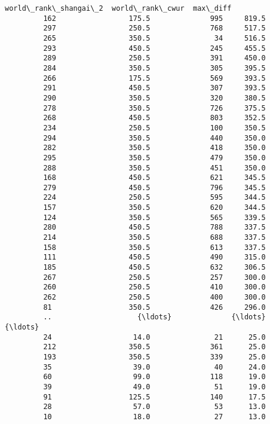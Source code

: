 \documentclass[11pt]{article}
\begin{document}
\begin{Verbatim}[commandchars=\\\{\}]
              world\_rank\_shangai\_2  world\_rank\_cwur  max\_diff  
         162                 175.5              995     819.5  
         297                 250.5              768     517.5  
         265                 350.5               34     516.5  
         293                 450.5              245     455.5  
         289                 250.5              391     450.0  
         284                 350.5              305     395.5  
         266                 175.5              569     393.5  
         291                 450.5              307     393.5  
         290                 350.5              320     380.5  
         278                 350.5              726     375.5  
         268                 450.5              803     352.5  
         234                 250.5              100     350.5  
         294                 350.5              440     350.0  
         282                 350.5              418     350.0  
         295                 350.5              479     350.0  
         288                 350.5              451     350.0  
         168                 450.5              621     345.5  
         279                 450.5              796     345.5  
         224                 250.5              595     344.5  
         157                 350.5              620     344.5  
         124                 350.5              565     339.5  
         280                 450.5              788     337.5  
         214                 350.5              688     337.5  
         158                 350.5              613     337.5  
         111                 450.5              490     315.0  
         185                 450.5              632     306.5  
         267                 250.5              257     300.0  
         260                 250.5              410     300.0  
         262                 250.5              400     300.0  
         81                  350.5              426     296.0  
         ..                    {\ldots}              {\ldots}       {\ldots}  
         24                   14.0               21      25.0  
         212                 350.5              361      25.0  
         193                 350.5              339      25.0  
         35                   39.0               40      24.0  
         60                   99.0              118      19.0  
         39                   49.0               51      19.0  
         91                  125.5              140      17.5  
         28                   57.0               53      13.0  
         10                   18.0               27      13.0  

\end{Verbatim}
\end{document}
